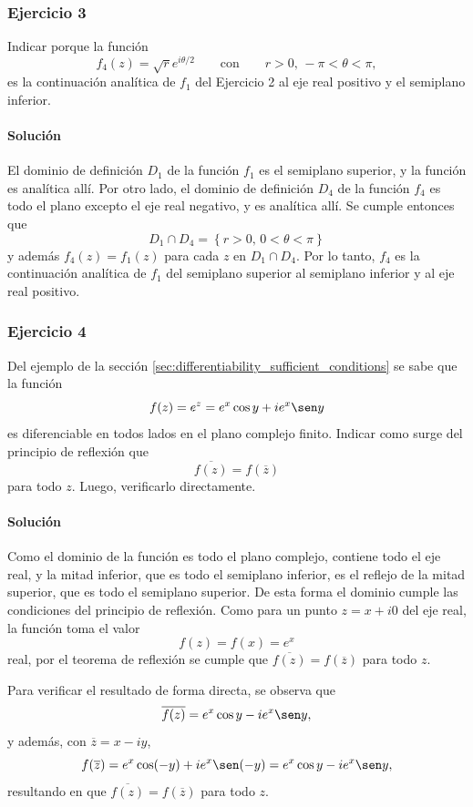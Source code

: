 \documentclass[a4paper]{report}
\begin{document}
\subsubsection{Ejercicio 3}

Indicar porque la función 
\[
 f_4(z)=\sqrt{r}e^{i\theta/2}\qquad\textrm{con}\qquad r>0,\,-\pi<\theta<\pi,
\]
es la continuación analítica de \(f_1\) del Ejercicio 2 al eje real positivo y el semiplano inferior.

\paragraph{Solución} El dominio de definición \(D_1\) de la función \(f_1\) es el semiplano superior, y la función es analítica allí. Por otro lado, el dominio de definición \(D_4\) de la función \(f_4\) es todo el plano excepto el eje real negativo, y es analítica allí. Se cumple entonces que 
\[
 D_1\cap D_4=\left\{r>0,\,0<\theta<\pi\right\}
\]
y además \(f_4(z)=f_1(z)\) para cada \(z\) en \(D_1\cap D_4\). Por lo tanto, \(f_4\) es la continuación analítica de \(f_1\) del semiplano superior al semiplano inferior y al eje real positivo.

\subsubsection{Ejercicio 4}

Del ejemplo de la sección \ref{sec:differentiability_sufficient_conditions} se sabe que la función 
\[
 f(z)=e^z=e^x\cos y+ie^x\sen y
\]
es diferenciable en todos lados en el plano complejo finito. Indicar como surge del principio de reflexión que 
\[
 \overline{f(z)}=f(\overline{z})
\]
para todo \(z\). Luego, verificarlo directamente.

\paragraph{Solución} Como el dominio de la función es todo el plano complejo, contiene todo el eje real, y la mitad inferior, que es todo el semiplano inferior, es el reflejo de la mitad superior, que es todo el semiplano superior. De esta forma el dominio cumple las condiciones del principio de reflexión. Como para un punto \(z=x+i0\) del eje real, la función toma el valor
\[
 f(z)=f(x)=e^x
\]
real, por el teorema de reflexión se cumple que \(\overline{f(z)}=f(\overline{z})\) para todo \(z\).

Para verificar el resultado de forma directa, se observa que 
\[
 \overline{f(z)}=e^x\cos y-ie^x\sen y,
\]
y además, con \(\overline{z}=x-iy\),
\[
 f(\overline{z})=e^x\cos(-y)+ie^x\sen(-y)=e^x\cos y-ie^x\sen y,
\]
resultando en que \(\overline{f(z)}=f(\overline{z})\) para todo \(z\).
\end{document}
